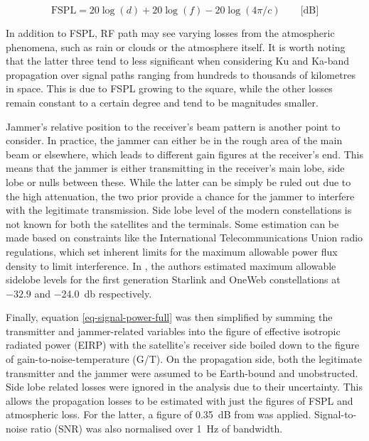 \documentclass[english, 12pt, a4paper, elec, utf8, a-1b, online]{aaltothesis}
\begin{document}
\begin{equation} \label{eq-fspl}
  \mathrm{FSPL} = 20\log(d)+20\log(f)-20\log(4\pi / c) \qquad \text{[dB]}
\end{equation}

In addition to FSPL, RF path may see varying losses from the atmospheric phenomena, such as rain or clouds or the atmosphere itself.
It is worth noting that the latter three tend to less significant when considering Ku and Ka-band propagation over signal paths ranging from hundreds to thousands of kilometres in space.
This is due to FSPL growing to the square, while the other losses remain constant to a certain degree and tend to be magnitudes smaller.

Jammer's relative position to the receiver's beam pattern is another point to consider. In practice, the jammer can either be in the rough area of the main beam or elsewhere, which leads to different gain figures at the receiver's end. This means that the jammer is either transmitting in the receiver's main lobe, side lobe or nulls between these. While the latter can be simply be ruled out due to the high attenuation, the two prior provide a chance for the jammer to interfere with the legitimate transmission. Side lobe level of the modern constellations is not known for both the satellites and the terminals. Some estimation can be made based on constraints like the International Telecommunications Union radio regulations, which set inherent limits for the maximum allowable power flux density to limit interference. In \cite{hills2023controlling}, the authors estimated maximum allowable sidelobe levels for the first generation Starlink and OneWeb constellations at $-32.9$ and \qty{-24.0}{\decibel} respectively. 

Finally, equation \ref{eq-signal-power-full} was then simplified by summing the transmitter and jammer-related variables into the figure of effective isotropic radiated power (EIRP) with the satellite's receiver side boiled down to the figure of gain-to-noise-temperature (G/T).
On the propagation side, both the legitimate transmitter and the jammer were assumed to be Earth-bound and unobstructed.
Side lobe related losses were ignored in the analysis due to their uncertainty.
This allows the propagation losses to be estimated with just the figures of FSPL and atmospheric loss.
For the latter, a figure of \SI{0.35}{\deci\bel} from \cite{kymeta2019link} was applied. Signal-to-noise ratio (SNR) was also normalised over \SI{1}{\hertz} of bandwidth.
\end{document}
